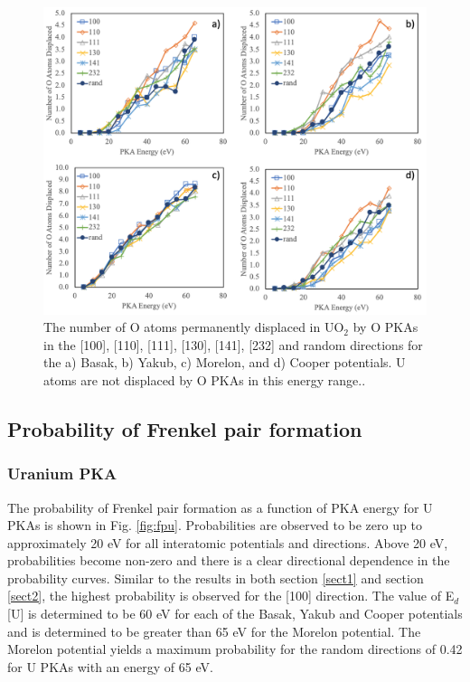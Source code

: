 \documentclass[review]{elsarticle}
\begin{document}
\begin{figure}[h]
 \centering
 \includegraphics[width=1.0\textwidth]{disp_allO.png}
 \caption{The number of O atoms permanently displaced in UO$_2$ by O PKAs in the [100], [110], [111], [130], [141], [232] and random directions for the a) Basak, b) Yakub, c) Morelon, and d) Cooper potentials. U atoms are not displaced by O PKAs in this energy range..}
 \label{fig:dispallO}
\end{figure}

\FloatBarrier


\subsection{Probability of Frenkel pair formation}

\subsubsection{Uranium PKA}

The probability of Frenkel pair formation as a function of PKA energy for U PKAs is shown in Fig. \ref{fig:fpu}. Probabilities are observed to be zero up to approximately 20 eV for all interatomic potentials and directions. Above 20 eV, probabilities become non-zero and there is a clear directional dependence in the probability curves. Similar to the results in both section \ref{sect1} and section \ref{sect2}, the highest probability is observed for the [100] direction. The value of E$_d$[U] is determined to be 60 eV for each of the Basak, Yakub and Cooper potentials and is determined to be greater than 65 eV for the Morelon potential. The Morelon potential yields a maximum probability for the random directions of 0.42 for U PKAs with an energy of 65 eV.
\end{document}
